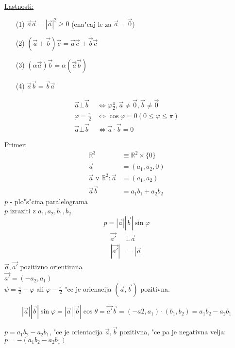 \underline{Lastnosti:}
\begin{enumerate}
	\item[(1)] \(\vec{a} \vec{a} = |\vec{a}|^2 \geq 0\) (ena"caj le za \(\vec{a} = \vec{0}\))
	\item[(2)] \((\vec{a} + \vec{b})\vec{c} = \vec{a}\vec{c} + \vec{b}\vec{c}\)
	\item[(3)] \((\alpha\vec{a})\vec{b} = \alpha(\vec{a}\vec{b})\)
	\item[(4)] \(\vec{a}\vec{b} = \vec{b}\vec{a}\)
\end{enumerate}

\begin{align*}
	\vec{a} \bot \vec{b} &\Leftrightarrow \varphi \frac{\pi}{2}, \vec{a} \neq \vec{0}, \vec{b} \neq \vec{0}\\
	\varphi = \frac{\pi}{2} &\Leftrightarrow \cos\varphi = 0 (0 \leq \varphi \leq \pi)\\
	\vec{a} \bot \vec{b} &\Leftrightarrow \vec{a} \cdot \vec{b} = 0
\end{align*}

\underline{Primer:}
\begin{align*}
	\mathbb{R}^3 &\equiv \mathbb{R}^2 \times \{0\}\\
	\vec{a} &= (a_1, a_2, 0)\\
	\vec{a} \text{ v } \mathbb{R}^2: \vec{a} &= (a_1, a_2)\\
	\vec{a} \vec{b} &= a_1b_1 + a_2b_2
\end{align*}
\(p\) - plo"s"cina paralelograma\\
\(p\) izraziti z \(a_1, a_2, b_1, b_2\)
\[p = |\vec{a}||\vec{b}|\sin\varphi\]
\begin{align*}
	\vec{a'} &\bot \vec{a}\\
	|\vec{a'}| &= |\vec{a}|
\end{align*}
\(\vec{a}, \vec{a'}\) pozitivno orientirana\\
\(\vec{a'} = (-a_2, a_1)\)\\
\(\psi = \frac{\pi}{2} - \varphi\) ali \(\varphi - \frac{\pi}{2}\) "ce je orienacija \((\vec{a}, \vec{b})\) pozitivna.

\[|\vec{a}||\vec{b}| \sin\varphi = |\vec{a}||\vec{b}|\cos\theta = \vec{a'}\vec{b} = (-a2, a_1) \cdot (b_1, b_2) = a_1b_2 - a_2b_1\]

\(p = a_1b_2 - a_2b_1\), "ce je orientacija \(\vec{a}, \vec{b}\) pozitivna, "ce pa je negativna velja: \(p = -(a_1b_2 - a_2b_1)\)

